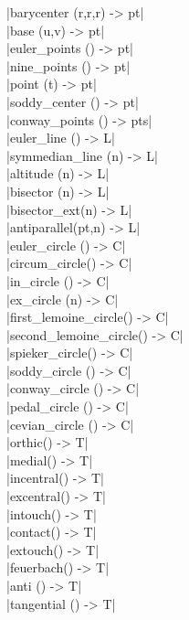 \documentclass[DIV         = 14,
               fontsize    = 10,
               index       = totoc,
               twoside,
               cadre,
               headings    = small
               ]{tkz-doc}
\begin{document}
\begin{multicols}{3}
|barycenter (r,r,r)        -> pt|  \\
|base (u,v)                -> pt|  \\
|euler_points ()           -> pt|  \\
|nine_points ()            -> pt|  \\
|point (t)                 -> pt|  \\
|soddy_center ()           -> pt|  \\
|conway_points ()          -> pts|  \\
|euler_line ()             -> L|   \\
|symmedian_line (n)        -> L|   \\
|altitude (n)              -> L|   \\
|bisector (n)              -> L|   \\
|bisector_ext(n)           -> L|   \\
|antiparallel(pt,n)        -> L|   \\
|euler_circle ()           -> C|   \\
|circum_circle()           -> C|   \\
|in_circle ()              -> C|   \\
|ex_circle (n)             -> C|   \\
|first_lemoine_circle()    -> C|   \\
|second_lemoine_circle()   -> C|   \\
|spieker_circle()          -> C|   \\
|soddy_circle ()           -> C|   \\
|conway_circle ()          -> C|   \\
|pedal_circle ()           -> C|   \\
|cevian_circle ()          -> C|   \\
|orthic()                  -> T|   \\
|medial()                  -> T|   \\
|incentral()               -> T|   \\
|excentral()               -> T|   \\
|intouch()                 -> T|   \\
|contact()                 -> T|   \\
|extouch()                 -> T|   \\
|feuerbach()               -> T|   \\
|anti ()                   -> T|   \\
|tangential ()             -> T|   \\

\end{multicols}
\end{document}
